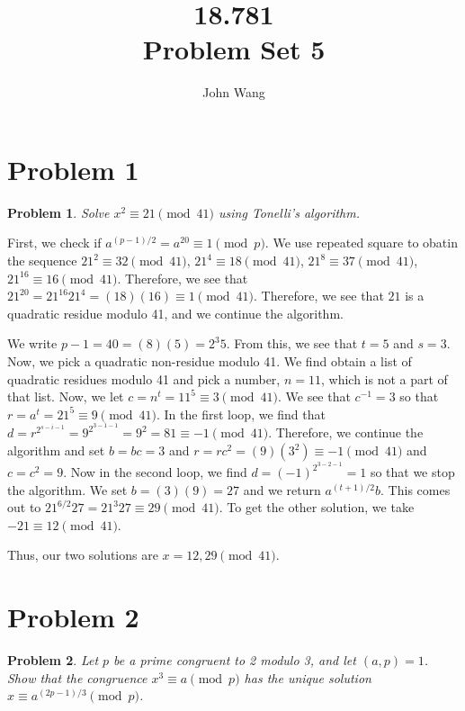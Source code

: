 \documentclass[psamsfonts]{amsart}
\title{18.781 \\
Problem Set 5}
\author{John Wang}
\newtheorem{prob}{Problem}[section]
\newenvironment{sol}{{\bfseries Solution}}{\qedsymbol}
\theoremstyle{definition}
\theoremstyle{remark}
\numberwithin{equation}{section}
\begin{document}
\maketitle

\section{Problem 1}

\begin{prob}
Solve $x^2 \equiv 21 \pmod{41}$ using Tonelli's algorithm.
\end{prob}

\begin{sol}
First, we check if $a^{(p-1)/2} = a^{20} \equiv 1 \pmod{p}$. We use repeated square to obatin the sequence $21^2 \equiv 32 \pmod{41}$, $21^4 \equiv 18 \pmod{41}$, $ 21^{8} \equiv 37 \pmod{41}$, $21^{16} \equiv 16 \pmod{41}$. Therefore, we see that $21^{20} = 21^{16} 21^4 = (18)(16) \equiv 1 \pmod{41}$. Therefore, we see that $21$ is a quadratic residue modulo 41, and we continue the algorithm.

We write $p - 1 = 40 = (8)(5) = 2^3 5$. From this, we see that $t = 5$ and $s = 3$. Now, we pick a quadratic non-residue modulo 41. We find obtain a list of quadratic residues modulo 41 and pick a number, $n = 11$, which is not a part of that list. Now, we let $c = n^t = 11^5 \equiv 3 \pmod{41}$. We see that $c^{-1} = 3$ so that $r = a^t = 21^5 \equiv 9 \pmod{41}$. In the first loop, we find that $d = r^{2^{s - i - 1}} = 9^{2^{3 - 1 - 1}} = 9^2 = 81 \equiv -1 \pmod{41}$. Therefore, we continue the algorithm and set $b = bc = 3$ and $r = r c^2 = (9)(3^2) \equiv -1 \pmod{41}$ and $c = c^2 = 9$. Now in the second loop, we find $d = (-1)^{2^{3-2-1}} = 1$ so that we stop the algorithm. We set $b = (3)(9) = 27$ and we return $a^{(t+1)/2} b$. This comes out to $21^{6/2} 27 = 21^3 27 \equiv 29 \pmod{41}$. To get the other solution, we take $-21 \equiv 12 \pmod{41}$. 

Thus, our two solutions are $x = 12, 29 \pmod{41}$.
\end{sol}

\section{Problem 2}

\begin{prob}
Let $p$ be a prime congruent to 2 modulo 3, and let $(a,p) = 1$. Show that the congruence $x^3 \equiv a \pmod{p}$ has the unique solution $x \equiv a^{(2p-1)/3} \pmod{p}$. 
\end{prob}
\end{document}
